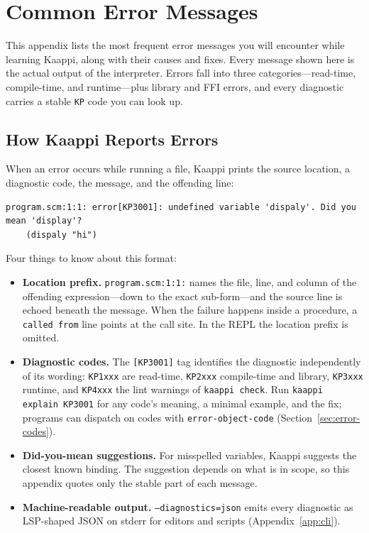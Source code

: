 \chapter{Common Error Messages}
\label{app:errors}

This appendix lists the most frequent error messages you will encounter while learning Kaappi, along with their causes and fixes. Every message shown here is the actual output of the interpreter. Errors fall into three categories---read-time, compile-time, and runtime---plus library and FFI errors, and every diagnostic carries a stable \texttt{KP} code you can look up.

\section{How Kaappi Reports Errors}

When an error occurs while running a file, Kaappi prints the source location, a diagnostic code, the message, and the offending line:

\begin{lstlisting}[style=repl]
program.scm:1:1: error[KP3001]: undefined variable 'dispaly'. Did you mean 'display'?
    (dispaly "hi")
\end{lstlisting}

Four things to know about this format:

\begin{itemize}
    \item \textbf{Location prefix.} \texttt{program.scm:1:1:} names the file, line, and column of the offending expression---down to the exact sub-form---and the source line is echoed beneath the message. When the failure happens inside a procedure, a \texttt{called from} line points at the call site. In the REPL the location prefix is omitted.
    \item \textbf{Diagnostic codes.} The \texttt{[KP3001]} tag identifies the diagnostic independently of its wording: \texttt{KP1xxx} are read-time, \texttt{KP2xxx} compile-time and library, \texttt{KP3xxx} runtime, and \texttt{KP4xxx} the lint warnings of \texttt{kaappi check}. Run \texttt{kaappi explain KP3001} for any code's meaning, a minimal example, and the fix; programs can dispatch on codes with \texttt{error-object-code} (Section~\ref{sec:error-codes}).
    \item \textbf{Did-you-mean suggestions.} For misspelled variables, Kaappi suggests the closest known binding. The suggestion depends on what is in scope, so this appendix quotes only the stable part of each message.
    \item \textbf{Machine-readable output.} \texttt{--diagnostics=json} emits every diagnostic as LSP-shaped JSON on stderr for editors and scripts (Appendix~\ref{app:cli}).
\end{itemize}

